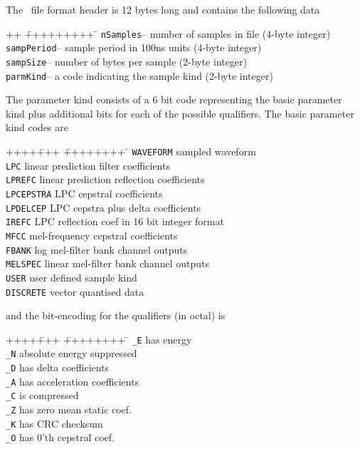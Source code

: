 The \HTK\ file format header is 12 bytes long and contains the following data 
\begin{tabbing}
++ \= +++++++++ \= \kill
\>\texttt{nSamples}\>-- number of samples in file (4-byte integer) \\
\>\texttt{sampPeriod}\>-- sample period in 100ns units (4-byte integer) \\
\>\texttt{sampSize}\>-- number of bytes per sample (2-byte integer) \\
\>\texttt{parmKind}\>-- a code indicating the sample kind (2-byte integer)
\end{tabbing}
The parameter kind consists of a 6 bit
code representing the basic parameter kind plus additional bits for
each of the possible qualifiers.  The basic parameter kind codes are
\begin{tabbing}
++++\= +++ \= ++++++++ \=   \kill
{} \> \texttt{WAVEFORM} \> sampled waveform \\
 \> \texttt{LPC} \> linear prediction filter coefficients \\
 \> \texttt{LPREFC} \> linear prediction reflection coefficients \\
 \> \texttt{LPCEPSTRA} \> LPC cepstral coefficients \\
 \> \texttt{LPDELCEP}  \> LPC cepstra plus delta coefficients \\
 \> \texttt{IREFC}       \> LPC reflection coef in 16 bit integer format  \\
 \> \texttt{MFCC}      \> mel-frequency cepstral coefficients \\
 \> \texttt{FBANK}     \> log mel-filter bank channel outputs \\
 \> \texttt{MELSPEC}     \> linear mel-filter bank channel outputs \\
 \> \texttt{USER}      \> user defined sample kind \\
 \> \texttt{DISCRETE} \> vector quantised data \\
\end{tabbing}
and the bit-encoding for the qualifiers (in octal) is 
\begin{tabbing}
++++\= +++ \= ++++++++ \=   \kill
\>\texttt{\_E}  \> has energy \\
\>\texttt{\_N}  \> absolute energy suppressed \\
\>\texttt{\_D}  \> has delta coefficients \\
\>\texttt{\_A}  \> has acceleration coefficients\\
\>\texttt{\_C}  \> is compressed \\
\>\texttt{\_Z}  \> has zero mean static coef. \\
\>\texttt{\_K}  \> has CRC checksum \\
\>\texttt{\_O}  \> has 0'th cepstral coef. \\
\end{tabbing}
